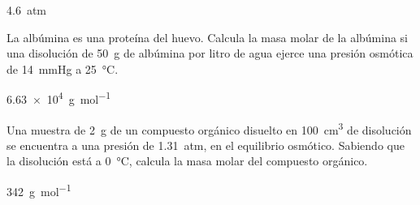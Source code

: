 \begin{solution}
  \SI{4.6}{atm}
\end{solution}




\begin{exercise}[
    tags    = {termodinámica, entalpía, entalpia de reacción, calor},
    topics  = {química, termoquímica, termodinámica},
    source  = {FQ 1B SAN 2015, p94, e59},
  ]
  La albúmina es una proteína del huevo. Calcula la masa
  molar de la albúmina si una disolución de \SI{50}{\gram} de albúmina
  por litro de agua ejerce una presión osmótica de
  \SI{14}{\mmHg} a \SI{25}{\celsius}.
\end{exercise}

\begin{solution}
  \SI{6.63e4}{\gram\per\mole}
\end{solution}




\begin{exercise}[
    tags    = {termodinámica, entalpía, entalpia de reacción, calor},
    topics  = {química, termoquímica, termodinámica},
    source  = {FQ 1B OXF 2015, p79, e50},
  ]
  Una muestra de \SI{2}{\gram} de un compuesto orgánico disuelto en \SI{100}{\cubic\centi\meter} de disolución se encuentra a una presión de \SI{1.31}{atm}, en el equilibrio osmótico. Sabiendo que la disolución está a \SI{0}{\celsius}, calcula la masa molar del compuesto orgánico.
\end{exercise}

\begin{solution}
  \SI{342}{\gram\per\mole}
\end{solution}
